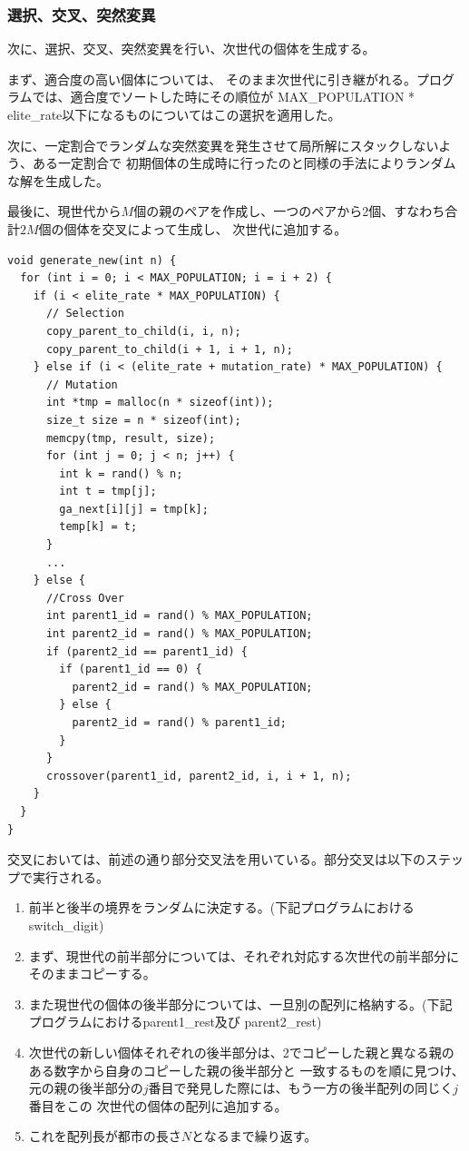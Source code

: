 \documentclass[uplatex]{jsarticle}
\begin{document}
\subsubsection{選択、交叉、突然変異}
次に、選択、交叉、突然変異を行い、次世代の個体を生成する。

まず、適合度の高い個体については、
そのまま次世代に引き継がれる。プログラムでは、適合度でソートした時にその順位が
MAX\_POPULATION * elite\_rate以下になるものについてはこの選択を適用した。

次に、一定割合でランダムな突然変異を発生させて局所解にスタックしないよう、ある一定割合で
初期個体の生成時に行ったのと同様の手法によりランダムな解を生成した。

最後に、現世代から$M$個の親のペアを作成し、一つのペアから2個、すなわち合計$2M$個の個体を交叉によって生成し、
次世代に追加する。

\begin{lstlisting}[basicstyle=\ttfamily\footnotesize, frame=single]
void generate_new(int n) {
  for (int i = 0; i < MAX_POPULATION; i = i + 2) {
    if (i < elite_rate * MAX_POPULATION) {
      // Selection
      copy_parent_to_child(i, i, n);
      copy_parent_to_child(i + 1, i + 1, n);
    } else if (i < (elite_rate + mutation_rate) * MAX_POPULATION) {
      // Mutation
      int *tmp = malloc(n * sizeof(int));
      size_t size = n * sizeof(int);
      memcpy(tmp, result, size);
      for (int j = 0; j < n; j++) {
        int k = rand() % n;
        int t = tmp[j];
        ga_next[i][j] = tmp[k];
        temp[k] = t;
      }
      ...
    } else {
      //Cross Over
      int parent1_id = rand() % MAX_POPULATION;
      int parent2_id = rand() % MAX_POPULATION;
      if (parent2_id == parent1_id) {
        if (parent1_id == 0) {
          parent2_id = rand() % MAX_POPULATION;
        } else {
          parent2_id = rand() % parent1_id;
        }
      }
      crossover(parent1_id, parent2_id, i, i + 1, n);
    }
  }
}
\end{lstlisting}

交叉においては、前述の通り部分交叉法を用いている。部分交叉は以下のステップで実行される。
\begin{enumerate}
  \item 前半と後半の境界をランダムに決定する。(下記プログラムにおけるswitch\_digit)
  \item まず、現世代の前半部分については、それぞれ対応する次世代の前半部分にそのままコピーする。
  \item また現世代の個体の後半部分については、一旦別の配列に格納する。(下記プログラムにおけるparent1\_rest及び
  parent2\_rest)
  \item 次世代の新しい個体それぞれの後半部分は、2でコピーした親と異なる親のある数字から自身のコピーした親の後半部分と
  一致するものを順に見つけ、元の親の後半部分の$j$番目で発見した際には、もう一方の後半配列の同じく$j$番目をこの
  次世代の個体の配列に追加する。
  \item これを配列長が都市の長さ$N$となるまで繰り返す。
\end{enumerate}
\end{document}

